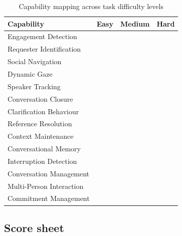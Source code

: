 \begin{table}[h]
	\centering
	\caption{Capability mapping across task difficulty levels}
	\label{tab:hri_capability_mapping}
	\begin{tabular}{lccc}
		\toprule
		\textbf{Capability} & \textbf{Easy} & \textbf{Medium} & \textbf{Hard} \\
		\midrule
		Engagement Detection     & \checkmark & \checkmark & \checkmark \\
		Requester Identification & \checkmark & \checkmark & \checkmark \\
		Social Navigation        & \checkmark & \checkmark & \checkmark \\
		Dynamic Gaze             & \checkmark & \checkmark & \checkmark \\
		Speaker Tracking         & \checkmark & \checkmark & \checkmark \\
		Conversation Closure     & \checkmark & \checkmark & \checkmark \\
		Clarification Behaviour  &            & \checkmark &            \\
		Reference Resolution     &            & \checkmark &            \\
		Context Maintenance      &            & \checkmark & \checkmark \\
		Conversational Memory    &            & \checkmark & \checkmark \\
		Interruption Detection   &            &            & \checkmark \\
		Conversation Management  &            &            & \checkmark \\
		Multi-Person Interaction &            &            & \checkmark \\
		Commitment Management    &            &            & \checkmark \\
		\bottomrule
	\end{tabular}
\end{table}

\subsection*{Score sheet}


